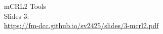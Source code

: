 \documentclass[aspectratio=169]{beamer}
\begin{document}


  


\begin{frame}
  \huge\centering
  mCRL2 Tools
  \\[5mm]\large
  Slides 3:\\\url{https://fm-dcc.github.io/sv2425/slides/3-mcrl2.pdf}
\end{frame}
\end{document}
